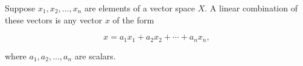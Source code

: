 Suppose $x_1, x_2, \ldots, x_n$ are elements of a vector space $X$. A linear combination of these vectors is any vector $x$ of the form

$$x = a_1 x_1 + a_2 x_2 + \cdots + a_n x_n,$$

where $a_1, a_2, \ldots, a_n$ are scalars.
